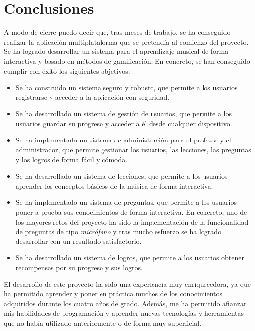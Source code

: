 \chapter{Conclusiones}
\label{cap:conclusiones}
A modo de cierre puedo decir que, tras meses de trabajo, se ha conseguido realizar la aplicación multiplataforma que se pretendía al comienzo del proyecto. 
Se ha logrado desarrollar un sistema para el aprendizaje musical de forma interactiva y basado en métodos de gamificación. En concreto, se han conseguido cumplir con éxito
los siguientes objetivos:
\begin{itemize}
    \item Se ha construido un sistema seguro y robusto, que permite a los usuarios registrarse y acceder a la aplicación con seguridad.
    \item Se ha desarrollado un sistema de gestión de usuarios, que permite a los usuarios guardar su progreso y acceder a él desde cualquier dispositivo.
    \item Se ha implementado un sistema de administración para el profesor y el administrador, que permite gestionar los usuarios, las lecciones, las preguntas y los logros de forma fácil y cómoda.
    \item Se ha desarrollado un sistema de lecciones, que permite a los usuarios aprender los conceptos básicos de la música de forma interactiva.
    \item Se ha implementado un sistema de preguntas, que permite a los usuarios poner a prueba sus conocimientos de forma interactiva. En concreto, uno de los mayores retos del proyecto ha sido la implementación de la funcionalidad de preguntas de tipo \textit{micrófono} y tras mucho
    esfuerzo se ha logrado desarrollar con un resultado satisfactorio.
    \item Se ha desarrollado un sistema de logros, que permite a los usuarios obtener recompensas por su progreso y sus logros.
\end{itemize}

El desarrollo de este proyecto ha sido una experiencia muy enriquecedora, ya que ha permitido aprender y poner en práctica muchos de los conocimientos adquiridos durante los cuatro años de grado. Además, me ha permitido afianzar mis habilidades de programación y aprender nuevas tecnologías y herramientas que no había utilizado anteriormente o de forma muy superficial.

